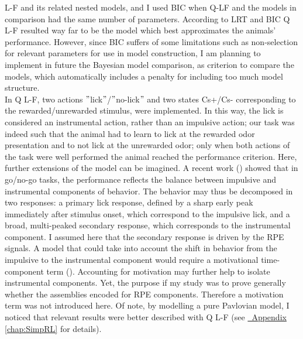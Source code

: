 L-F and its related nested models, and I used BIC when Q-LF and the models in comparison had the same number of parameters. According to LRT and BIC Q L-F resulted way far to be the model which best approximates the animals$’$ performance. However, since BIC suffers of some limitations such as  non-selection for relevant parameters for use in model construction, I am planning to implement in future the Bayesian model comparison, as criterion to compare the models, which automatically includes a penalty for including too much model structure.\\In Q L-F, two actions $"$lick$"$/$"$no-lick$"$ and two states Cs+/Cs- corresponding to the rewarded/unrewarded stimulus, were implemented. In this way, the lick is considered an instrumental action, rather than an impulsive action; our task was indeed such that the animal had to learn to lick at the rewarded odor presentation and to not lick at the unrewarded odor; only when both actions of the task were well performed the animal reached the performance criterion. Here, further extensions of the model can be imagined. A recent work (\cite{SchultzMot}) showed that in go/no-go tasks, the performance reflects the balance between impulsive and instrumental components of behavior. The behavior may thus be decomposed in two responses: a primary lick response, defined by a sharp early peak immediately after stimulus onset, which correspond to the impulsive lick, and a broad, multi-peaked secondary response, which corresponds to the instrumental component. I assumed here that the secondary response is driven by the RPE signals. A model that could take into account the shift in behavior from the impulsive to the instrumental component would require a motivational time-component term (\cite{SchultzMot}). Accounting for motivation may further help to isolate instrumental components. Yet,  the purpose if my study was to prove generally whether the assemblies encoded for RPE components. Therefore a motivation term was not introduced here. Of note, by modelling a pure Pavlovian model, I noticed that relevant results were better described with Q L-F (see \hyperref[chap:SimpRL]{~Appendix \ref*{chap:SimpRL}} for details).\\\\
